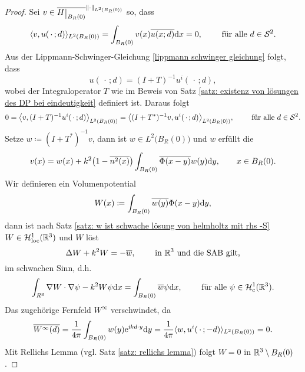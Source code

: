 \begin{proof}
	Sei \(v\in\overline{H\restrict{B_R(0)}}^{\|\cdot\|_{L^2(B_R(0))}}\) so, dass
	\begin{equation*}
		\langle v,u(\,\cdot\,;d)\rangle_{L^2(B_R(0))}=\int_{B_R(0)}v(x)\overline{u(x;d)}\mathrm{d}x=0,\qquad\text{ für alle }d\in\mathcal{S}^2.
	\end{equation*}
	Aus der Lippmann-Schwinger-Gleichung \eqref{lippmann schwinger gleichung} folgt, dass
	\begin{equation*}
		u(\,\cdot\,;d)=(I+T)^{-1}u^i(\,\cdot\,;d),
	\end{equation*}
	wobei der Integraloperator \(T\) wie im Beweis von Satz \ref{satz: existenz von lösungen des DP bei eindeutigkeit} definiert ist. Daraus folgt
	\begin{equation}
		\label{herleitung zur adjungierten gleichung}
		0=\big\langle v,(I+T)^{-1}u^i(\,\cdot\,;d)\big\rangle_{L^2(B_R(0))}=\big\langle (I+T^\ast)^{-1}v,u^i(\,\cdot\,;d)\big\rangle_{L^2(B_R(0))},\qquad\text{ für alle }d\in\mathcal{S}^2.
	\end{equation}
	Setze \(w\coloneqq(I+T^\ast)^{-1}v\), dann ist \(w\in L^2\big(B_R(0)\big)\) und \(w\) erfüllt die 
	\begin{equation*}
		v(x)=w(x)+k^2\big(1-\overline{n^2(x)}\big)\int_{B_R(0)}\overline{\Phi(x-y)}w(y)\mathrm{d}y,\qquad x\in B_R(0).
	\end{equation*}
	Wir definieren ein Volumenpotential
	\begin{equation*}
		W(x)\coloneqq\int_{B_R(0)}\overline{w(y)}\Phi(x-y)\mathrm{d}y,
	\end{equation*}
	dann ist nach Satz \ref{satz: w ist schwache lösung von helmholtz mit rhs -S} \(W\in\mathcal{H}_{\mathrm{loc}}^1(\mathbb{R}^3)\) und \(W\) löst
	\begin{equation*}
		\Delta W+k^2W=-\overline{w},\qquad\text{ in }\mathbb{R}^3\text{ und die SAB gilt,}
	\end{equation*}
	im schwachen Sinn, d.h.
	\begin{equation}
		\label{volumenpotential zur adjungierten gleichung in schwacher form eingesetzt}
		\int_{R^3}\nabla W\cdot\nabla\psi-k^2W\psi\mathrm{d}x=\int_{B_R(0)}\overline{w}\psi\mathrm{d}x,\qquad\text{ für alle }\psi\in\mathcal{H}_{\mathrm{c}}^1(\mathbb{R}^3).
	\end{equation}
	Das zugehörige Fernfeld \(W^\infty\) verschwindet, da
	\begin{equation*}
		\overline{W^\infty(d)}=\frac{1}{4\pi}\int_{B_R(0)}w(y)\mathrm{e}^{\mathrm{i} kd\cdot y}\mathrm{d}y=\frac{1}{4\pi}\langle w,u^i(\,\cdot\,;-d)\rangle_{L^2(B_R(0))}=0.
	\end{equation*}
	Mit Rellichs Lemma (vgl. Satz \ref{satz: rellichs lemma}) folgt \(W=0\) in \(\mathbb{R}^3\setminus B_R(0)\).\vspace{1.5mm}
	

\end{proof}
